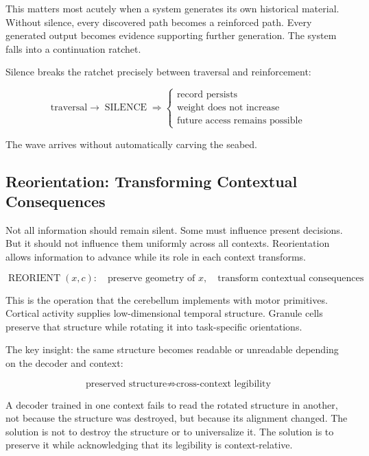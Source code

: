 \documentclass[12pt]{article}
\begin{document}
This matters most acutely when a system generates its own historical material. Without silence, every discovered path becomes a reinforced path. Every generated output becomes evidence supporting further generation. The system falls into a continuation ratchet.

Silence breaks the ratchet precisely between traversal and reinforcement:

\begin{equation}
\text{traversal} \rightarrow \operatorname{SILENCE} \Rightarrow \begin{cases}
\text{record persists}\\
\text{weight does not increase}\\
\text{future access remains possible}
\end{cases}
\end{equation}

The wave arrives without automatically carving the seabed.

\subsection{Reorientation: Transforming Contextual Consequences}

Not all information should remain silent. Some must influence present decisions. But it should not influence them uniformly across all contexts. Reorientation allows information to advance while its role in each context transforms.

\begin{equation}
\operatorname{REORIENT}(x, c): \quad \text{preserve geometry of } x, \quad \text{transform contextual consequences}
\end{equation}

This is the operation that the cerebellum implements with motor primitives. Cortical activity supplies low-dimensional temporal structure. Granule cells preserve that structure while rotating it into task-specific orientations.

The key insight: the same structure becomes readable or unreadable depending on the decoder and context:

\begin{equation}
\boxed{\text{preserved structure} \not\Rightarrow \text{cross-context legibility}}
\end{equation}

A decoder trained in one context fails to read the rotated structure in another, not because the structure was destroyed, but because its alignment changed. The solution is not to destroy the structure or to universalize it. The solution is to preserve it while acknowledging that its legibility is context-relative.
\end{document}
